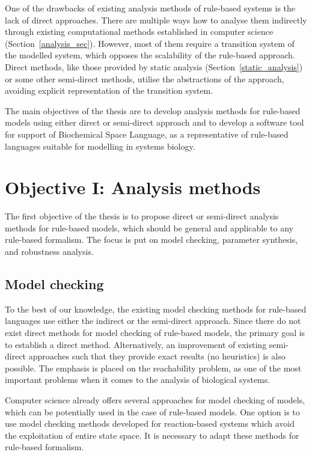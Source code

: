 \documentclass[11pt,a4paper]{report}
\begin{document}
One of the drawbacks of existing analysis methods of rule-based systems is the lack of direct approaches. There are multiple ways how to analyse them indirectly through existing computational methods established in computer science (Section~\ref{analysis_sec}). However, most of them require a transition system of the modelled system, which opposes the scalability of the rule-based approach. Direct methods, like those provided by static analysis (Section~\ref{static_analysis}) or some other semi-direct methods, utilise the abstractions of the approach, avoiding explicit representation of the transition system. 

The main objectives of the thesis are to develop analysis methods for rule-based models using either direct or semi-direct approach and to develop a software tool for support of Biochemical Space Language, as a representative of rule-based languages suitable for modelling in systems biology.

\section{Objective I: Analysis methods}

The first objective of the thesis is to propose direct or semi-direct analysis methods for rule-based models, which should be general and applicable to any rule-based formalism. The focus is put on model checking, parameter synthesis, and robustness analysis.

\subsection{Model checking}

To the best of our knowledge, the existing model checking methods for rule-based languages use either the indirect or the semi-direct approach. Since there do not exist direct methods for model checking of rule-based models, the primary goal is to establish a direct method. Alternatively, an improvement of existing semi-direct approaches such that they provide exact results (no heuristics) is also possible. The emphasis is placed on the reachability problem, as one of the most important problems when it comes to the analysis of biological systems.

Computer science already offers several approaches for model checking of models, which can be potentially used in the case of rule-based models. One option is to use model checking methods developed for reaction-based systems which avoid the exploitation of entire state space. It is necessary to adapt these methods for rule-based formalism.
\end{document}
